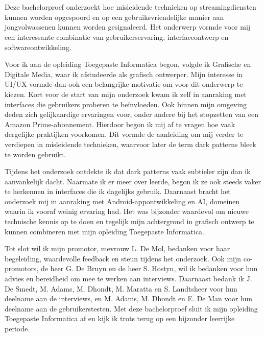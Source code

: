 
\chapter*{}%
\label{ch:voorwoord}


Deze bachelorproef onderzoekt hoe misleidende technieken op streamingdiensten kunnen worden opgespoord en op een gebruiksvriendelijke manier aan jongvolwassenen kunnen worden gesignaleerd. Het onderwerp vormde voor mij een interessante combinatie van gebruikerservaring, interfaceontwerp en softwareontwikkeling.

\vspace{1em}

Voor ik aan de opleiding Toegepaste Informatica begon, volgde ik Grafische en Digitale Media, waar ik afstudeerde als grafisch ontwerper. Mijn interesse in UI/UX vormde dan ook een belangrijke motivatie om voor dit onderwerp te kiezen. Kort voor de start van mijn onderzoek kwam ik zelf in aanraking met interfaces die gebruikers proberen te beïnvloeden. Ook binnen mijn omgeving deden zich gelijkaardige ervaringen voor, onder andere bij het stopzetten van een Amazon Prime-abonnement. Hierdoor begon ik mij af te vragen hoe vaak dergelijke praktijken voorkomen. Dit vormde de aanleiding om mij verder te verdiepen in misleidende technieken, waarvoor later de term dark patterns bleek te worden gebruikt.

\vspace{1em}

Tijdens het onderzoek ontdekte ik dat dark patterns vaak subtieler zijn dan ik aanvankelijk dacht. Naarmate ik er meer over leerde, begon ik ze ook steeds vaker te herkennen in interfaces die ik dagelijks gebruik. Daarnaast bracht het onderzoek mij in aanraking met Android-appontwikkeling en AI, domeinen waarin ik vooraf weinig ervaring had. Het was bijzonder waardevol om nieuwe technische kennis op te doen en tegelijk mijn achtergrond in grafisch ontwerp te kunnen combineren met mijn opleiding Toegepaste Informatica.

\vspace{1em}

Tot slot wil ik mijn promotor, mevrouw L. De Mol, bedanken voor haar begeleiding, waardevolle feedback en steun tijdens het onderzoek. Ook mijn co-promotors, de heer G. De Bruyn en de heer S. Hostyn, wil ik bedanken voor hun advies en bereidheid om mee te werken aan interviews. Daarnaast bedank ik J. De Smedt, M. Adams, M. Dhondt, M. Maratta en S. Landtsheer voor hun deelname aan de interviews, en M. Adams, M. Dhondt en E. De Man voor hun deelname aan de gebruikerstesten. Met deze bachelorproef sluit ik mijn opleiding Toegepaste Informatica af en kijk ik trots terug op een bijzonder leerrijke periode.